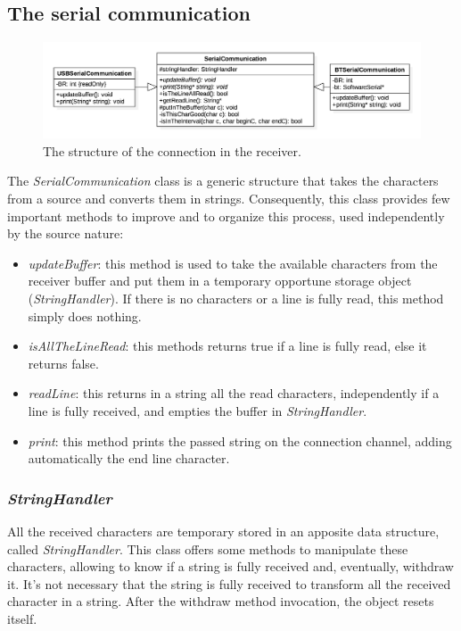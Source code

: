 \subsection{The serial communication}
\begin{figure}[h!]
	\centering
	\hspace*{-0.25 \textwidth}\includegraphics[width= 1.5\textwidth]
	{files/images/ArduinoConnection}
	\caption{The structure of the connection in the receiver.}
	\label{fig:connection}
\end{figure}
The \textit{SerialCommunication} class is a generic structure that takes the characters from a source and converts them in strings. Consequently, this class provides few important methods to improve and to organize this process, used independently by the source nature:
\begin{itemize}
	\item \textit{updateBuffer}: this method is used to take the available characters from the receiver buffer and put them in a temporary opportune storage object (\textit{StringHandler}). If there is no characters or a line is fully read, this method simply does nothing.
	\item \textit{isAllTheLineRead}: this methods returns true if a line is fully read, else it returns false.
	\item \textit{readLine}: this returns in a string all the read characters, independently if a line is fully received, and empties the buffer in \textit{StringHandler}.
	\item \textit{print}: this method prints the passed string on the connection channel, adding automatically the end line character.
\end{itemize}

\subsubsection{\textit{StringHandler}}
All the received characters are temporary stored in an apposite data structure, called \textit{StringHandler}. This class offers some methods to manipulate these characters, allowing to know if a string is fully received and, eventually, withdraw it. It's not necessary that the string is fully received to transform all the received character in a string. After the withdraw method invocation, the object resets itself.

